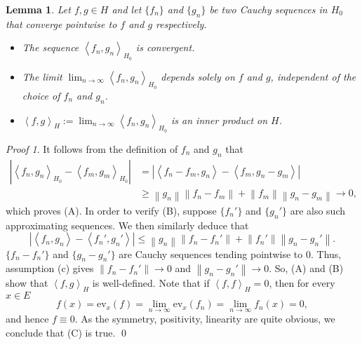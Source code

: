 \documentclass[a4paper,12pt]{article}
\newtheorem{lem}[thm]{Lemma}
\theoremstyle{remark}
\newtheorem*{prf}{Proof}
\theoremstyle{definition}
\theoremstyle{definition}
\theoremstyle{definition}
\newcommand{\ip}[2]{\left<#1, #2 \right>}
\newcommand{\abs}[1]{\left| #1 \right|}
\newcommand{\norm}[1]{\left\| #1 \right\|}
\newcommand{\ev}[1]{\mathrm{ev}_{#1}}
\begin{document}
\begin{lem}\label{construction of inner product}
	Let \( f,g \in H \) and let \( \{f_n\} \) and \( \{g_n\} \) be two Cauchy sequences in \( H_0 \) that converge pointwise to \( f \) and \( g \) respectively.
	\begin{itemize}
		\item[(A)] The sequence \( \ip{f_n}{g_n}_{H_0} \) is convergent.
		\item[(B)] The limit \( \lim_{n \to \infty} \ip{f_n}{g_n}_{H_0} \) depends solely on \( f \) and \( g \), independent of the choice of \( f_n \) and \( g_n \).
		\item[(C)] \( \ip{f}{g}_H := \lim_{n \to \infty} \ip{f_n}{g_n}_{H_0} \) is an inner product on \( H \).
	\end{itemize}
\end{lem}
\begin{prf}
	It follows from the definition of \( f_n \) and \( g_n \) that
	\begin{equation*}
		\begin{aligned}
			\abs{\ip{f_n}{g_n}_{H_0} - \ip{f_m}{g_m}_{H_0}}
			 & = \abs{\ip{f_n - f_m}{g_n} - \ip{f_m}{g_n - g_m}}                    \\
			 & \ge \norm{g_n} \norm{f_n - f_m} + \norm{f_m} \norm{g_n - g_m} \to 0,
		\end{aligned}
	\end{equation*}
	which proves (A). In order to verify (B), suppose \( \{f_n'\} \) and \( \{g_n'\} \) are also such approximating sequences. We then similarly deduce that
	\begin{equation*}
		\abs{\ip{f_n}{g_n} - \ip{f_n'}{g_n'}} \le \norm{g_n}\norm{f_n- f_n'} + \norm{f_n'}\norm{g_n - g_n'}.
	\end{equation*}
	\( \{f_n- f_n'\} \) and \( \{g_n-g_n'\} \) are Cauchy sequences tending pointwise to 0. Thus, assumption (c) gives \( \norm{f_n-f_n'}\to 0 \) and \( \norm{g_n - g_n'}\to 0 \). So, (A) and (B) show that \( \ip{f}{g}_H \) is well-defined. Note that if \( \ip{f}{f}_H = 0\), then for every \( x \in E \)
	\begin{equation*}
		f(x) = \ev{x}(f) = \lim_{n \to \infty} \ev{x}(f_n) = \lim_{n \to \infty} f_n(x) = 0,
	\end{equation*}
	and hence \( f \equiv 0 \). As the symmetry, positivity, linearity are quite obvious, we conclude that (C) is true.
	\qed\end{prf}
\end{document}
